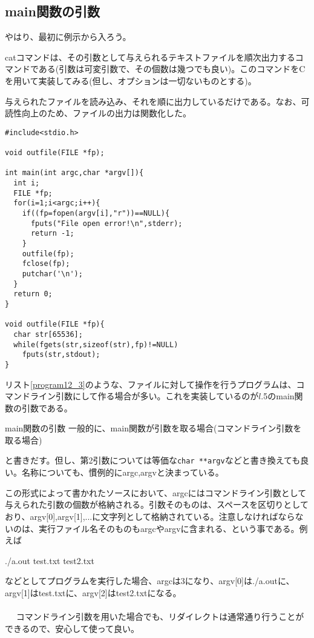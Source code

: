 \subsection{main関数の引数}
やはり、最初に例示から入ろう。
\begin{boxnote}
catコマンドは、その引数として与えられるテキストファイルを順次出力するコマンドである(引数は可変引数で、その個数は幾つでも良い)。このコマンドをCを用いて実装してみる(但し、オプションは一切ないものとする)。
\end{boxnote}
\begin{boxnote}
与えられたファイルを読み込み、それを順に出力しているだけである。なお、可読性向上のため、ファイルの出力は関数化した。
\begin{lstlisting}[caption=簡易版catコマンド,label=program12_3]
#include<stdio.h>

void outfile(FILE *fp);

int main(int argc,char *argv[]){
  int i;
  FILE *fp;
  for(i=1;i<argc;i++){
    if((fp=fopen(argv[i],"r"))==NULL){
      fputs("File open error!\n",stderr);
      return -1;
    }
    outfile(fp);
    fclose(fp);
    putchar('\n');
  }
  return 0;
}

void outfile(FILE *fp){
  char str[65536];
  while(fgets(str,sizeof(str),fp)!=NULL)
    fputs(str,stdout);
}
\end{lstlisting}
\end{boxnote}

リスト\ref{program12_3}のような、ファイルに対して操作を行うプログラムは、コマンドライン引数にして作る場合が多い。これを実装しているのが$l$.5のmain関数の引数である。
\begin{itembox}[l]{main関数の引数}
一般的に、main関数が引数を取る場合(コマンドライン引数を取る場合)
\begin{code}
int main(int argc,char *argv[]){
\end{code}
と書きだす。但し、第2引数については等価な\verb|char **argv|などと書き換えても良い。名称についても、慣例的にargc,argvと決まっている。
\end{itembox}

この形式によって書かれたソースにおいて、argcにはコマンドライン引数として与えられた引数の個数が格納される。引数そのものは、スペースを区切りとしており、argv[0],argv[1],...に文字列として格納されている。注意しなければならないのは、実行ファイル名そのものもargcやargvに含まれる、という事である。例えば
\begin{code}
./a.out test.txt test2.txt
\end{code}
などとしてプログラムを実行した場合、argcは3になり、argv[0]は./a.outに、argv[1]はtest.txtに、argv[2]はtest2.txtになる。
\\ \\　
コマンドライン引数を用いた場合でも、リダイレクトは通常通り行うことができるので、安心して使って良い。

